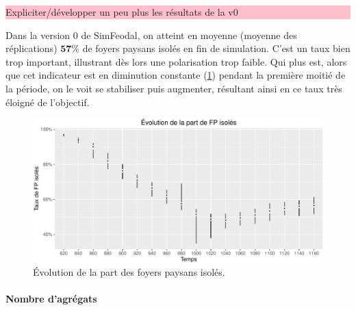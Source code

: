 \documentclass[12pt, a4paper, oneside]{book}
\begin{document}
	\begin{mdframed}[backgroundcolor=gray!10,footnoteinside=false]
		
	\colorbox{pink}{\parbox{0.9\textwidth}{%
		\vskip5pt
		Expliciter/développer un peu plus les résultats de la v0
		\vskip5pt
		}
	}	
		
	Dans la version 0 de SimFeodal, on atteint en moyenne (moyenne des réplications) $\textbf{57\%}$ de foyers paysans isolés en fin de simulation.
	C'est un taux bien trop important, illustrant dès lors une polarisation trop faible. Qui plus est, alors que cet indicateur est en diminution constante (\cref{fig:taux-isoles-v0}) pendant la première moitié de la période, on le voit se stabiliser puis augmenter, résultant ainsi en ce taux très éloigné de l'objectif.
	\end{mdframed}
	
	\begin{figure}[H]
		\captionsetup{width=\linewidth}
		\includegraphics[width=\linewidth]{img/resultats/v0_taux_FP_isoles.pdf}
		\caption{Évolution de la part des foyers paysans isolés.} 
		\label{fig:taux-isoles-v0} 
	\end{figure}
	
	\paragraph{Nombre d'agrégats}
	
\end{document}

